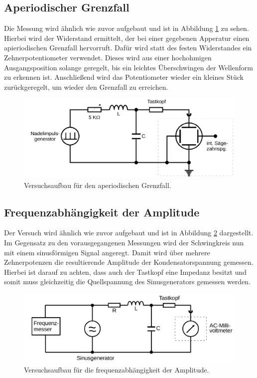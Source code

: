 \subsection{Aperiodischer Grenzfall}
Die Messung wird ähnlich wie zuvor aufgebaut und ist in Abbildung \ref{fig:aufbau2} zu sehen.
Hierbei wird der Widerstand ermittelt, der bei einer gegebenen Apperatur einen apieriodischen Grenzfall hervorruft.
Dafür wird statt des festen Widerstandes ein Zehnerpotentiometer verwendet.
Dieses wird aus einer hochohmigen Ausgangsposition solange geregelt, bis ein leichtes Überschwingen der Wellenform zu erkennen ist.
Anschließend wird das Potentiometer wieder ein kleines Stück zurückgeregelt, um wieder den Grenzfall zu erreichen.
\begin{figure}[H]
    \centering
    \caption{Versuchsaufbau für den aperiodischen Grenzfall.\cite{v354}}
    \label{fig:aufbau2}
    \includegraphics[width=\textwidth]{content/aufbau2.png}
\end{figure}
\noindent
%
\subsection{Frequenzabhängigkeit der Amplitude}
Der Versuch wird ähnlich wie zuvor aufgebaut und ist in Abbildung \ref{fig:aufbau3} dargestellt.
Im Gegensatz zu den vorausgegangenen Messungen wird der Schwingkreis nun mit einem sinusförmigen Signal angeregt.
Damit wird über mehrere Zehnerpotenzen die resultierende Amplitude der Kondensatorspannung gemessen.
Hierbei ist darauf zu achten, dass auch der Tastkopf eine Impedanz besitzt und somit muss gleichzeitig die Quellspannung des Sinusgenerators gemessen werden.
\begin{figure}[H]
    \centering
    \caption{Versuchsaufbau für die frequenzabhängigkeit der Amplitude.\cite{v354}}
    \label{fig:aufbau3}
    \includegraphics[width=\textwidth]{content/aufbau3.png}
\end{figure}
\noindent
%
